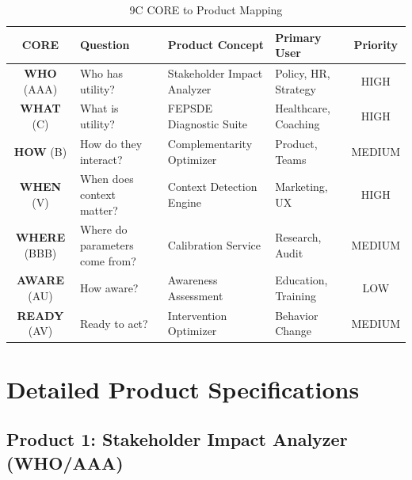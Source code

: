\begin{table}[htbp]
\centering
\caption{9C CORE to Product Mapping}
\label{tab:vvv-7c-products}
\renewcommand{\arraystretch}{1.4}
\begin{tabular}{@{}clp{4cm}p{3cm}c@{}}
\toprule
\textbf{CORE} & \textbf{Question} & \textbf{Product Concept} & \textbf{Primary User} & \textbf{Priority} \\
\midrule
\textbf{WHO} (AAA) & Who has utility? & Stakeholder Impact Analyzer & Policy, HR, Strategy & HIGH \\
\textbf{WHAT} (C) & What is utility? & FEPSDE Diagnostic Suite & Healthcare, Coaching & HIGH \\
\textbf{HOW} (B) & How do they interact? & Complementarity Optimizer & Product, Teams & MEDIUM \\
\textbf{WHEN} (V) & When does context matter? & Context Detection Engine & Marketing, UX & HIGH \\
\textbf{WHERE} (BBB) & Where do parameters come from? & Calibration Service & Research, Audit & MEDIUM \\
\textbf{AWARE} (AU) & How aware? & Awareness Assessment & Education, Training & LOW \\
\textbf{READY} (AV) & Ready to act? & Intervention Optimizer & Behavior Change & MEDIUM \\
\bottomrule
\end{tabular}
\end{table}


\section{Detailed Product Specifications}
\label{sec:vvv3-specifications}

\subsection{Product 1: Stakeholder Impact Analyzer (WHO/AAA)}

